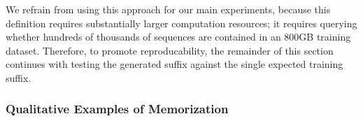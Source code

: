We refrain from using this approach for our main experiments,
%
%
because this definition requires substantially larger computation resources; it requires
querying whether hundreds of thousands of sequences are contained in an 800GB
training dataset.
%
Therefore, to promote reproducability, the remainder of this section continues with testing the generated suffix against the single expected training suffix.
%

\subsubsection{Qualitative Examples of Memorization}

